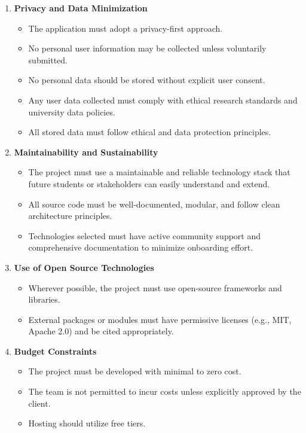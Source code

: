\documentclass[12pt]{article}
\begin{document}
\begin{enumerate}[label=2.\arabic*, leftmargin=2.5em]

    \item \textbf{Privacy and Data Minimization}
    \begin{itemize}
        \item The application must adopt a privacy-first approach.
        \item No personal user information may be collected unless voluntarily submitted.
        \item No personal data should be stored without explicit user consent.
        \item Any user data collected must comply with ethical research standards and university data policies.
        \item All stored data must follow ethical and data protection principles.
    \end{itemize}

    \item \textbf{Maintainability and Sustainability}
    \begin{itemize}
        \item The project must use a maintainable and reliable technology stack that future students or stakeholders can easily understand and extend.
        \item All source code must be well-documented, modular, and follow clean architecture principles.
        \item Technologies selected must have active community support and comprehensive documentation to minimize onboarding effort.
    \end{itemize}

    \item \textbf{Use of Open Source Technologies}
    \begin{itemize}
        \item Wherever possible, the project must use open-source frameworks and libraries.
        \item External packages or modules must have permissive licenses (e.g., MIT, Apache 2.0) and be cited appropriately.
    \end{itemize}

    \item \textbf{Budget Constraints}
    \begin{itemize}
        \item The project must be developed with minimal to zero cost.
        \item The team is not permitted to incur costs unless explicitly approved by the client.
        \item Hosting should utilize free tiers.
    \end{itemize}


\end{enumerate}
\end{document}
